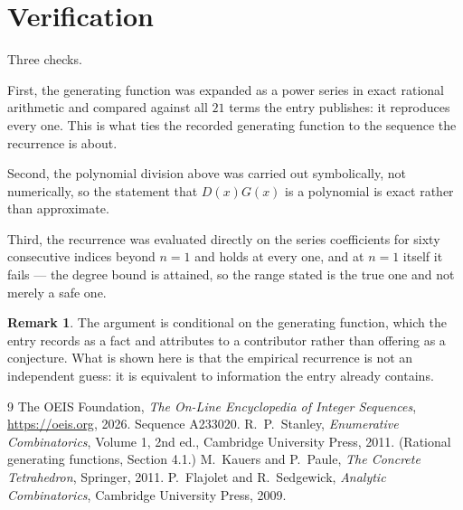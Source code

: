 \documentclass[11pt,a4paper]{article}
\theoremstyle{plain}
\theoremstyle{definition}
\newtheorem{remark}[theorem]{Remark}
\begin{document}
\section{Verification}

Three checks.

First, the generating function was expanded as a power series in exact rational arithmetic and
compared against all $21$ terms the entry publishes: it reproduces every one. This is
what ties the recorded generating function to the sequence the recurrence is about.

Second, the polynomial division above was carried out symbolically, not numerically, so the
statement that $D(x)G(x)$ is a polynomial is exact rather than approximate.

Third, the recurrence was evaluated directly on the series coefficients for sixty consecutive
indices beyond $n=1$ and holds at every one, and at $n=1$ itself it fails --- the
degree bound is attained, so the range stated is the true one and not merely a safe one.

\begin{remark}
The argument is conditional on the generating function, which the entry records as a fact and
attributes to a contributor rather than offering as a conjecture. What is shown here is that
the empirical recurrence is not an independent guess: it is equivalent to information the
entry already contains.
\end{remark}

\begin{thebibliography}{9}
 The OEIS Foundation, \emph{The On-Line Encyclopedia of Integer
Sequences}, \url{https://oeis.org}, 2026. Sequence A233020.
 R.~P.~Stanley, \emph{Enumerative Combinatorics}, Volume 1, 2nd ed.,
Cambridge University Press, 2011. (Rational generating functions, Section 4.1.)
 M.~Kauers and P.~Paule, \emph{The Concrete Tetrahedron}, Springer, 2011.
 P.~Flajolet and R.~Sedgewick, \emph{Analytic Combinatorics}, Cambridge
University Press, 2009.
\end{thebibliography}
\end{document}
